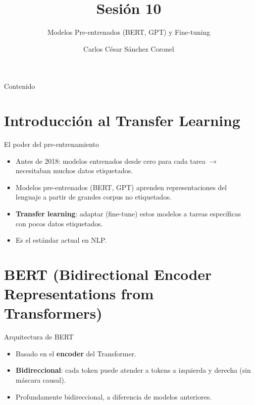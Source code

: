 \documentclass[aspectratio=169, 10pt, xcolor=table]{beamer}
\title[SESIÓN 10 NLP]{\textbf{Sesión 10}}
\subtitle{Modelos Pre-entrenados (BERT, GPT) y Fine-tuning}
\author[Prof. C. Sánchez]{Carlos César Sánchez Coronel}
\institute{\textbf{NLP}}
\date{}
\begin{document}
\begin{frame}
    \titlepage
\end{frame}

\begin{frame}{Contenido}
    \tableofcontents
\end{frame}

\section{Introducción al Transfer Learning}

\begin{frame}{El poder del pre-entrenamiento}
    \begin{itemize}
        \item Antes de 2018: modelos entrenados desde cero para cada tarea $\rightarrow$ necesitaban muchos datos etiquetados.
        \item Modelos pre-entrenados (BERT, GPT) aprenden representaciones del lenguaje a partir de grandes corpus no etiquetados.
        \item \textbf{Transfer learning}: adaptar (fine-tune) estos modelos a tareas específicas con pocos datos etiquetados.
        \item Es el estándar actual en NLP.
    \end{itemize}
\end{frame}

\section{BERT (Bidirectional Encoder Representations from Transformers)}

\begin{frame}{Arquitectura de BERT}
    \begin{itemize}
        \item Basado en el \textbf{encoder} del Transformer.
        \item \textbf{Bidireccional}: cada token puede atender a tokens a izquierda y derecha (sin máscara causal).
        \item Profundamente bidireccional, a diferencia de modelos anteriores.
    \end{itemize}
\end{frame}
\end{document}
